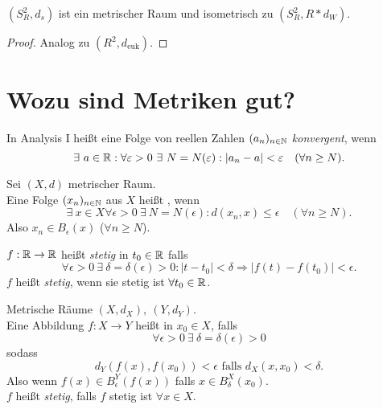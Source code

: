 \begin{theorem}
  $ (S^2_R, d_s) $ ist ein metrischer Raum und isometrisch zu $ (S^2_R, R*d_W) $.
  \begin{proof}
    Analog zu $ (R^2, d_\text{euk}) $.
  \end{proof}
\end{theorem}

\section{Wozu sind Metriken gut?}

\begin{remark}
  In Analysis I heißt eine Folge von reellen Zahlen $ (a_n)_{n \in \mathbb{N}} $ \emph{konvergent}, wenn
  \begin{equation*}
    \exists \ a \in \mathbb{R} : \forall \varepsilon > 0 \ \exists \ N = N(\varepsilon) : \vert a_n - a \vert < \varepsilon \quad (\forall n \geq N)\text{.}
  \end{equation*}
\end{remark}

\begin{remark}
  Sei $ (X, d) $ metrischer Raum. \\
  Eine Folge $ (x_n)_{n \in \mathbb{N}} $ aus $ X $ heißt , wenn
  \begin{equation*}
    \exists \ x \in X \forall \epsilon > 0 \ \exists \ N = N(\epsilon) : d(x_n, x) \leq \epsilon \quad (\forall n \geq N)\text{.}
  \end{equation*}
  Also $ x_n \in B_\epsilon(x) $ ($ \forall n \geq N $).
\end{remark}

\begin{remark}
  $ f: \mathbb{R} \to \mathbb{R} $ heißt \emph{stetig} in $ t_0 \in \mathbb{R} $ falls
  \begin{equation*}
    \forall \epsilon > 0 \ \exists \ \delta = \delta(\epsilon) > 0 : \vert t - t_0 \vert < \delta \Rightarrow \vert f(t)-f(t_0) \vert < \epsilon\text{.}
  \end{equation*}
  $ f $ heißt \emph{stetig}, wenn sie stetig ist $ \forall t_0 \in \mathbb{R} $.
\end{remark}

\begin{remark}
  Metrische Räume $ (X, d_X), \ (Y, d_Y) $. \\
  Eine Abbildung $ f: X \to Y $ heißt  in $ x_0 \in X $, falls
  \begin{equation*}
    \forall \epsilon > 0 \ \exists \ \delta = \delta(\epsilon) > 0
  \end{equation*}
  sodass
  \begin{equation*}
    d_Y(f(x), f(x_0)) < \epsilon \text{ falls } d_X(x, x_0) < \delta\text{.}
  \end{equation*}
  Also wenn $ f(x) \in B_\epsilon^Y(f(x)) $ falls $ x \in B_\delta^X(x_0) $. \\
  $ f $ heißt \emph{stetig}, falls $ f $ stetig ist $ \forall x \in X $.
\end{remark}


